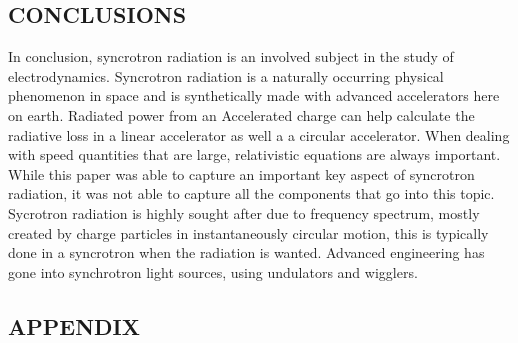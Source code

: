 \documentclass[a4paper]{article}
\begin{document}

\begin{center}
\section{CONCLUSIONS}
\end{center}

In conclusion, syncrotron radiation is an involved subject in the study of electrodynamics. Syncrotron radiation is a naturally occurring physical phenomenon in space and is synthetically made with advanced accelerators here on earth. 
Radiated power from an Accelerated charge can help calculate the radiative loss in a linear accelerator as well a a circular accelerator. When dealing with speed quantities that are large, relativistic equations are always important. While this paper was able to capture an important key aspect of syncrotron radiation, it was not able to capture all the components that go into this topic. Sycrotron radiation is highly sought after due to frequency spectrum, mostly created by charge particles in instantaneously circular motion, this is typically done in a syncrotron when the radiation is wanted. Advanced engineering has gone into synchrotron light sources, using undulators and wigglers.
\newpage

\begin{center}
\nocite{*}


\end{center}

\newpage

\begin{center}
\section{APPENDIX}
\end{center}
\end{document}
